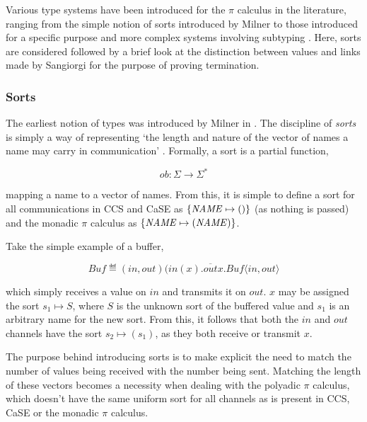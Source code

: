 Various type systems have been introduced for the $\pi$ calculus in
the literature, ranging from the simple notion of sorts introduced by
Milner \cite{milner:pi} to those introduced for a specific purpose
\cite{sangiorgi:types-or} and more complex systems involving subtyping
\cite{sangiorgi:typing}.  Here, sorts are considered followed by a
brief look at the distinction between values and links made by
Sangiorgi \cite{sangiorgi:types-or} for the purpose of proving
termination.

\subsubsection{Sorts}
\label{sorts}

The earliest notion of types was introduced by Milner in
\cite{milner:93polyadic,milner:pi}.  The discipline of \emph{sorts}
is simply a way of representing `the length and nature of the vector
of names a name may carry in communication' \cite{milner:93polyadic}.
Formally, a sort is a partial function,

\begin{equation}
ob : \Sigma \rightarrow \Sigma^*
\end{equation}

\noindent mapping a name to a vector of names.  From this, it is
simple to define a sort for all communications in CCS and CaSE as
$\{\mathit{NAME} \mapsto ()\}$ (as nothing is passed) and the monadic $\pi$
calculus as $\{\mathit{NAME} \mapsto (\mathit{NAME})\}$.

Take the simple example of a buffer,

\begin{equation}
  Buf \eqdef (in,out)(in(x).\overline{out}x.Buf\langle in,
  out\rangle 
\end{equation}

\noindent which simply receives a value on $in$ and transmits it on
$out$.  $x$ may be assigned the sort $s_1 \mapsto S$, where $S$ is the
unknown sort of the buffered value and $s_1$ is an arbitrary name for
the new sort.  From this, it follows that both the $in$ and $out$
channels have the sort $s_2 \mapsto (s_1)$, as they both receive or
transmit $x$.

The purpose behind introducing sorts is to make explicit the need to
match the number of values being received with the number being sent.
Matching the length of these vectors becomes a necessity when dealing
with the polyadic $\pi$ calculus, which doesn't have the same uniform
sort for all channels as is present in CCS, CaSE or the monadic $\pi$
calculus.

